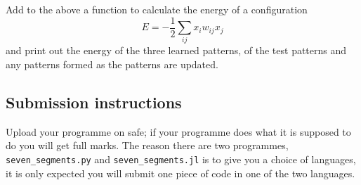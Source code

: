 \documentclass[12pt]{article}
\begin{document}
Add to the above a function to calculate the energy of a configuration
\begin{equation}
E=-\frac{1}{2}\sum_{ij} x_i w_{ij} x_j
\end{equation}
and print out the energy of the three learned patterns, of the test
patterns and any patterns formed as the patterns are updated.

\subsection*{Submission instructions}

Upload your programme on safe; if your programme does what it is
supposed to do you will get full marks. The reason there are two
programmes, \texttt{seven\_segments.py} and
\texttt{seven\_segments.jl} is to give you a choice of languages, it
is only expected you will submit one piece of code in one of the two
languages.
\end{document}
